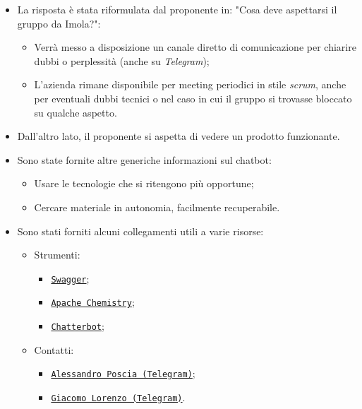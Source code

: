 \documentclass[11pt]{article}
\begin{document}
\begin{enumerate}
			\begin{itemize}
				\item La risposta è stata riformulata dal proponente in: "Cosa deve aspettarsi il gruppo da Imola?":
				\begin{itemize}
					\item Verrà messo a disposizione un canale diretto di comunicazione per chiarire dubbi o perplessità (anche su
					\textit{Telegram});
					\item L'azienda rimane disponibile per meeting periodici in stile \textit{scrum}, anche per eventuali dubbi tecnici
					o nel caso in cui il gruppo si trovasse bloccato su qualche aspetto.
				\end{itemize}
				\item Dall'altro lato, il proponente si aspetta di vedere un prodotto funzionante.
				\item Sono state fornite altre generiche informazioni sul chatbot:
				\begin{itemize}
					\item Usare le tecnologie che si ritengono più opportune;
					\item Cercare materiale in autonomia, facilmente recuperabile.
				\end{itemize}
				\item Sono stati forniti alcuni collegamenti utili a varie risorse:
				\begin{itemize}
					\item Strumenti:
					\begin{itemize}
						\item \href{https://editor.swagger.io/}{\texttt{Swagger}};
						\item \href{https://chemistry.apache.org/}{\texttt{Apache Chemistry}};
						\item \href{https://www.datacamp.com/community/tutorials/building-a-chatbot-using-chatterbot}{\texttt{Chatterbot}};
					\end{itemize}
					\item Contatti:
					\begin{itemize}
						\item \href{https://t.me/aleproscia}{\texttt{Alessandro Poscia (Telegram)}};
						\item \href{https://t.me/giacomolorenzo}{\texttt{Giacomo Lorenzo (Telegram)}}.
					\end{itemize}
				\end{itemize}
			\end{itemize}
		\end{enumerate}
		
\end{document}
